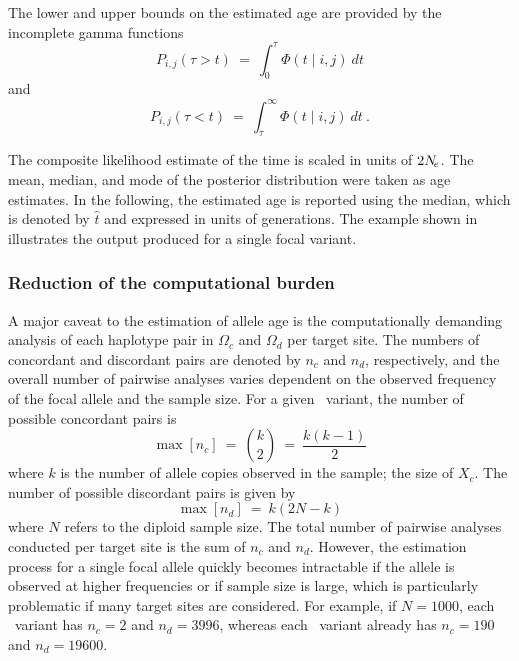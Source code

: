 The lower and upper bounds on the estimated age are provided by the incomplete gamma functions
\begin{equation}
	P_{i,j}(\tau > t) ~=~ \int_{0}^{\tau} \Phi(t \mid i,j) ~dt
\end{equation}
and
\begin{equation}
	P_{i,j}(\tau < t) ~=~ \int_{\tau}^{\infty} \Phi(t \mid i,j) ~dt \ .
\end{equation}

%

%

The composite likelihood estimate of the time is scaled in units of ${2 N_{\!e}}$.
The mean, median, and mode of the posterior distribution were taken as age estimates.
In the following, the estimated age is reported using the median, which is denoted by $\hat{t}$ and expressed in units of generations.
The example shown in  illustrates the output produced for a single focal variant.


%
\subsubsection{Reduction of the computational burden}
%

A major caveat to the estimation of allele age is the computationally demanding analysis of each haplotype pair in $\Omega_c$ and $\Omega_d$ per target site.
The numbers of concordant and discordant pairs are denoted by $n_c$ and $n_d$, respectively, and the overall number of pairwise analyses varies dependent on the observed frequency of the focal allele and the sample size.
For a given \fk{}~variant, the number of possible concordant pairs is
\begin{equation}\label{eq:age_nc}
	\max[n_c] ~=~ {{k}\choose{2}} ~=~ \frac{k(k-1)}{2}
\end{equation}
where $k$ is the number of allele copies observed in the sample; \ie the size of $X_c$.
The number of possible discordant pairs is given by
\begin{equation}\label{eq:age_nd}
	\max[n_d] ~=~ k(2N-k)
\end{equation}
where $N$ refers to the diploid sample size.
The total number of pairwise analyses conducted per target site is the sum of $n_c$ and $n_d$.
However, the estimation process for a single focal allele quickly becomes intractable if the allele is observed at higher frequencies or if sample size is large, which is particularly problematic if many target sites are considered.
For example, if ${N=\num{1000}}$, each ~variant has ${n_c=2}$ and ${n_d=\num{3996}}$, whereas each ~variant already has ${n_c=\num{190}}$ and ${n_d=\num{19600}}$.


